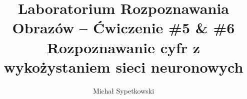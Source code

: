 \documentclass[a4paper]{article}
\begin{document}
\title{ Laboratorium Rozpoznawania Obrazów – Ćwiczenie \#5 \& \#6 Rozpoznawanie cyfr z wykożystaniem sieci neuronowych}



\author{Michał Sypetkowski}
\maketitle
\end{document}
